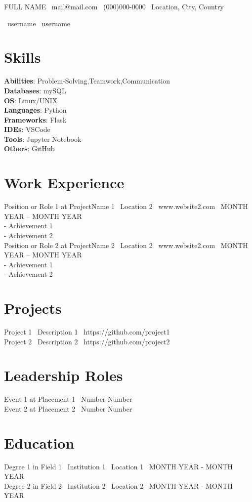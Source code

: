 \documentclass[a4paper,10pt]{article}
\begin{document}
\newcommand{\Name}[1]{{\Huge #1}}
\newcommand{\Phone}[1]{{ \faPhone\ #1}}
\newcommand{\Email}[1]{{ \faEnvelope\  #1}}
\newcommand{\Address}[1]{{ \faMapPin\ #1}}
\newcommand{\GitHubURL}[1]{{\faGithub\ #1}}
\newcommand{\LinkedInURL}[1]{{\faLinkedin\ #1}}

\Name{FULL NAME}
\Email {mail@mail.com}
\Phone {(000)000-0000}
\Address {Location, City, Country}

\GitHubURL {username}
\LinkedInURL {username}
\section*{Skills}\textbf{Abilities}: Problem-Solving,Teamwork,Communication \\ 
\textbf{Databases}: mySQL \\ 
\textbf{OS}: Linux/UNIX \\ 
\textbf{Languages}: Python \\ 
\textbf{Frameworks}: Flask \\ 
\textbf{IDEs}: VSCode \\ 
\textbf{Tools}: Jupyter Notebook \\ 
\textbf{Others}: GitHub \\ 
\section*{Work Experience}Position or Role 1 at ProjectName 1 \ Location 2 \ www.website2.com \ MONTH YEAR – MONTH YEAR \\ 
- Achievement 1 \\ 
- Achievement 2 \\ 
Position or Role 2 at ProjectName 2 \ Location 2 \ www.website2.com \ MONTH YEAR – MONTH YEAR \\ 
- Achievement 1 \\ 
- Achievement 2 \\ 
\section*{Projects}Project 1 \ Description 1 \ https://github.com/project1 \\ 
Project 2 \ Description 2 \ https://github.com/project2 \\ 
\section*{Leadership Roles}Event 1 at Placement 1 \ Number Number\\ 
Event 2 at Placement 2 \ Number Number\\ 
\section*{Education}Degree 1 in Field 1 \ Institution 1 \ Location 1 \ MONTH YEAR - MONTH YEAR \\ 
Degree 2 in Field 2 \ Institution 2 \ Location 2 \ MONTH YEAR - MONTH YEAR \\ 
\end{document}
